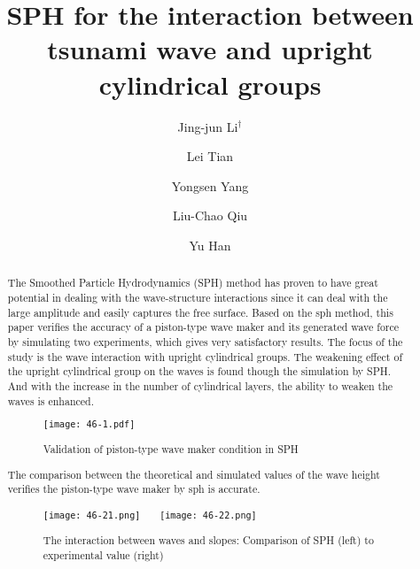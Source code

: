 \documentclass[10pt]{article}
\title{SPH for the interaction between tsunami wave and upright cylindrical groups}
\date{}
\author[$\relax$]{Jing-jun Li$^\dagger$}
\author[$\relax$]{Lei Tian}
\author[$\relax$]{Yongsen Yang}
\author[$\relax$]{Liu-Chao Qiu}
\author[$\relax$]{Yu Han}
\affil[$\relax$]{China Agricultural University, China}
\affil[$\relax$]{\email{\dagger}{LiJingjunedu@163.com}}
\begin{document}
\maketitle


\begin{abstract}
The Smoothed Particle Hydrodynamics (SPH) method has proven to have great potential in dealing with the wave-structure interactions since it can deal with the large amplitude and easily captures the free surface. Based on the sph method, this paper verifies the accuracy of a piston-type wave maker and its generated wave force by simulating two experiments, which gives very satisfactory results. The focus of the study is the wave interaction with upright cylindrical groups. The weakening effect of the upright cylindrical group on the waves is found though the simulation by SPH. And with the increase in the number of cylindrical layers, the ability to weaken the waves is enhanced.

\begin{figure}[!htb]
\centering
\texttt{[image: 46-1.pdf]}
\caption{Validation of piston-type wave maker condition in SPH}\label{fig:46-1}
\end{figure}

The comparison between the theoretical and simulated values of the wave height verifies the piston-type wave maker by sph is accurate.

\begin{figure}[!htb]
\centering
\texttt{[image: 46-21.png]}~~~
\texttt{[image: 46-22.png]}
\caption{The interaction between waves and slopes: Comparison of SPH (left) to experimental value (right)}\label{fig:46-2}
\end{figure}

\end{abstract}



\addbib
\end{document}
